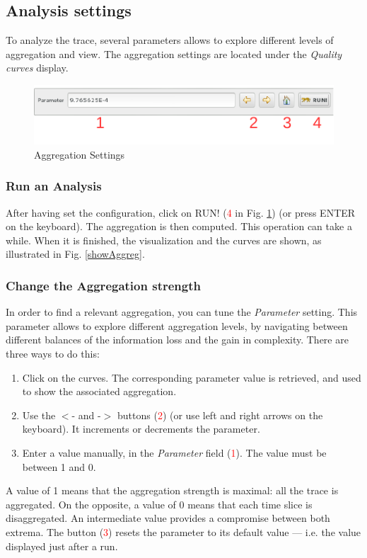 \documentclass[twoside]{article}
\begin{document}
\begin{sloppypar}
\subsection{Analysis settings}
To analyze the trace, several parameters allows to explore  different levels of aggregation and view. The aggregation settings are located under the \textit{Quality curves} display.
 
\begin{figure}[h!]
	\centering
	\includegraphics[scale=1.0]{images/aggregationSettings.pdf}
	\caption{Aggregation Settings}
	\label{aggregSettings}
\end{figure}

\subsubsection{Run an Analysis}
After having set the configuration, click on RUN! (\textcolor{red}{4} in Fig. \ref{aggregSettings}) (or press ENTER on the keyboard). The aggregation is then computed. This operation can take a while. When it is finished, the visualization and the curves are shown, as illustrated in Fig. \ref{showAggreg}.

\subsubsection{Change the Aggregation strength}
In order to find a relevant aggregation, you can tune the \textit{Parameter} setting. This parameter allows to explore different aggregation levels, by navigating between different balances of the information loss and the gain in complexity. There are three ways to do this:
\begin{enumerate}
	\item Click on the curves. The corresponding parameter value is retrieved, and used to show the associated aggregation.
	\item Use the $<$- and -$>$ buttons (\textcolor{red}{2}) (or use left and right arrows on the keyboard). It increments or decrements the parameter.
	\item Enter a value manually, in the \textit{Parameter} field (\textcolor{red}{1}). The value must be between 1 and 0.
\end{enumerate}
A value of 1 means that the aggregation strength is maximal: all the trace is aggregated. On the opposite, a value of 0 means that each time slice is disaggregated. An intermediate value provides a compromise between both extrema. The button (\textcolor{red}{3}) resets the parameter to its default value --- i.e. the value displayed just after a run.


\end{sloppypar}
\end{document}
